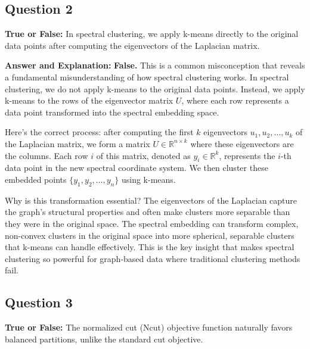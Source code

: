\documentclass[11pt]{article}
\newenvironment{answer}{\color{answercolor}\begin{framed}\textbf{Answer and Explanation:}}{\end{framed}}
\begin{document}
\subsection{Question 2}
\textbf{True or False:} In spectral clustering, we apply k-means directly to the original data points after computing the eigenvectors of the Laplacian matrix.

\begin{answer}
\textbf{False.} This is a common misconception that reveals a fundamental misunderstanding of how spectral clustering works. In spectral clustering, we do not apply k-means to the original data points. Instead, we apply k-means to the rows of the eigenvector matrix $U$, where each row represents a data point transformed into the spectral embedding space.

Here's the correct process: after computing the first $k$ eigenvectors $u_1, u_2, \ldots, u_k$ of the Laplacian matrix, we form a matrix $U \in \mathbb{R}^{n \times k}$ where these eigenvectors are the columns. Each row $i$ of this matrix, denoted as $y_i \in \mathbb{R}^k$, represents the $i$-th data point in the new spectral coordinate system. We then cluster these embedded points $\{y_1, y_2, \ldots, y_n\}$ using k-means.

Why is this transformation essential? The eigenvectors of the Laplacian capture the graph's structural properties and often make clusters more separable than they were in the original space. The spectral embedding can transform complex, non-convex clusters in the original space into more spherical, separable clusters that k-means can handle effectively. This is the key insight that makes spectral clustering so powerful for graph-based data where traditional clustering methods fail.
\end{answer}

\subsection{Question 3}
\textbf{True or False:} The normalized cut (Ncut) objective function naturally favors balanced partitions, unlike the standard cut objective.
\end{document}
